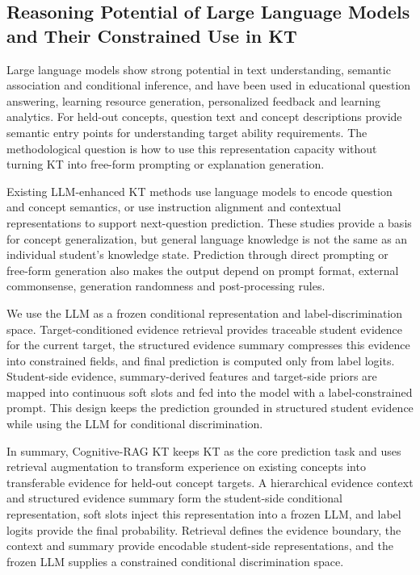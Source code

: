 \documentclass[a4paper,12pt]{article}
\numberwithin{table}{section}
\begin{document}
\subsection{Reasoning Potential of Large Language Models and Their Constrained Use in KT}

Large language models show strong potential in text understanding, semantic association and conditional inference, and have been used in educational question answering, learning resource generation, personalized feedback and learning analytics\citep{kasneci2023chatgpt,cho2024systematic}. For held-out concepts, question text and concept descriptions provide semantic entry points for understanding target ability requirements. The methodological question is how to use this representation capacity without turning KT into free-form prompting or explanation generation.

Existing LLM-enhanced KT methods use language models to encode question and concept semantics, or use instruction alignment and contextual representations to support next-question prediction\citep{fu2024sinkt,wang2025llmkt}. These studies provide a basis for concept generalization, but general language knowledge is not the same as an individual student's knowledge state. Prediction through direct prompting or free-form generation also makes the output depend on prompt format, external commonsense, generation randomness and post-processing rules.

We use the LLM as a frozen conditional representation and label-discrimination space. Target-conditioned evidence retrieval provides traceable student evidence for the current target, the structured evidence summary compresses this evidence into constrained fields, and final prediction is computed only from label logits. Student-side evidence, summary-derived features and target-side priors are mapped into continuous soft slots and fed into the model with a label-constrained prompt. This design keeps the prediction grounded in structured student evidence while using the LLM for conditional discrimination.

In summary, Cognitive-RAG KT keeps KT as the core prediction task and uses retrieval augmentation to transform experience on existing concepts into transferable evidence for held-out concept targets. A hierarchical evidence context and structured evidence summary form the student-side conditional representation, soft slots inject this representation into a frozen LLM, and label logits provide the final probability. Retrieval defines the evidence boundary, the context and summary provide encodable student-side representations, and the frozen LLM supplies a constrained conditional discrimination space.
\end{document}

